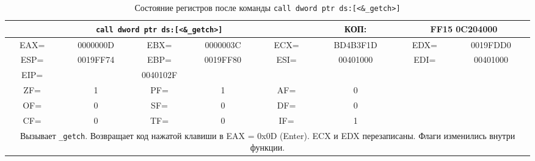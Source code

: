 \begin{table}[H]
    \centering
    \caption{Состояние регистров после команды \texttt{call dword ptr ds:[<\&\_getch>]}}
    \label{tab:after_call_getch}
    \small
    \renewcommand{\arraystretch}{1.3}
    \begin{tabular}{|c|c|c|c|c|c|c|c|}
    \hline
    \multicolumn{5}{|c|}{\cellcolor{green!40}\textbf{\texttt{call dword ptr ds:[<\&\_getch>]}}} & \cellcolor{green!20} КОП: & \multicolumn{2}{c|}{\cellcolor{green!20} FF15 0C204000} \\
    \hline
    \cellcolor{blue!30} EAX= & \cellcolor{red!70} 0000000D & \cellcolor{blue!30} EBX= & 0000003C & \cellcolor{blue!30} ECX= & \cellcolor{red!70} BD4B3F1D & \cellcolor{blue!30} EDX= & \cellcolor{red!70} 0019FDD0 \\
    \hline
    \cellcolor{blue!30} ESP= & 0019FF74 & \cellcolor{blue!30} EBP= & 0019FF80 & \cellcolor{blue!30} ESI= & 00401000 & \cellcolor{blue!30} EDI= & 00401000 \\
    \hline
    \cellcolor{blue!30} EIP= & \multicolumn{3}{c|}{\cellcolor{red!70} 0040102F} & \multicolumn{4}{c|}{} \\
    \hline
    \cellcolor{pink} ZF= & \cellcolor{red!70} 1 & \cellcolor{pink} PF= & 1 & \cellcolor{pink} AF= & \cellcolor{red!70} 0 & \multicolumn{2}{c|}{\cellcolor{gray!50}} \\
    \cline{1-6}
    \cellcolor{pink} OF= & 0 & \cellcolor{pink} SF= & 0 & \cellcolor{pink} DF= & 0 & \multicolumn{2}{c|}{\cellcolor{gray!50}} \\
    \cline{1-6}
    \cellcolor{pink} CF= & 0 & \cellcolor{pink} TF= & 0 & \cellcolor{pink} IF= & 1 & \multicolumn{2}{c|}{\cellcolor{gray!50}} \\
    \hline
    \multicolumn{8}{|p{14cm}|}{Вызывает \texttt{\_getch}. Возвращает код нажатой клавиши в EAX = 0x0D (Enter). ECX и EDX перезаписаны. Флаги изменились внутри функции.} \\
    \hline
    \end{tabular}
\end{table}

